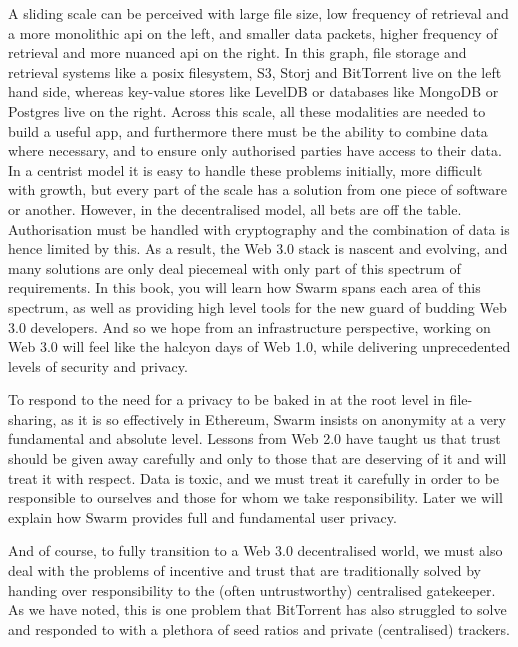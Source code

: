 A sliding scale can be perceived with large file size, low frequency of retrieval and a more monolithic api on the left, and smaller data packets, higher frequency of retrieval and more nuanced api on the right. In this graph, file storage and retrieval systems like a posix filesystem, S3, Storj and BitTorrent live on the left hand side, whereas key-value stores like LevelDB or databases like MongoDB or Postgres live on the right. Across this scale, all these modalities are needed to build a useful app, and furthermore there must be the ability to combine data where necessary, and to ensure only authorised parties have access to their data. In a centrist model it is easy to handle these problems initially, more difficult with growth, but every part of the scale has a solution from one piece of software or another. However, in the decentralised model, all bets are off the table. Authorisation must be handled with cryptography and the combination of data is hence limited by this. As a result, the Web 3.0 stack is nascent and evolving, and many solutions are only deal piecemeal with only part of this spectrum of requirements. In this book, you will learn how Swarm spans each area of this spectrum, as well as providing high level tools for the new guard of budding Web 3.0 developers. And so we hope from an infrastructure perspective, working on Web 3.0 will feel like the halcyon days of Web 1.0, while delivering unprecedented levels of security and privacy.

To respond to the need for a privacy to be baked in at the root level in file-sharing, as it is so effectively in Ethereum, Swarm insists on anonymity at a very fundamental and absolute level. Lessons from Web 2.0 have taught us that trust should be given away carefully and only to those that are deserving of it and will treat it with respect. Data is toxic, and we must treat it carefully in order to be responsible to ourselves and those for whom we take responsibility. Later we will explain how Swarm provides full and fundamental user privacy.

And of course, to fully transition to a Web 3.0 decentralised world, we must also deal with the problems of incentive and trust that are traditionally solved by handing over responsibility to the (often untrustworthy) centralised gatekeeper. As we have noted, this is one problem that BitTorrent has also struggled to solve and responded to with a plethora of seed ratios and private (centralised) trackers.

